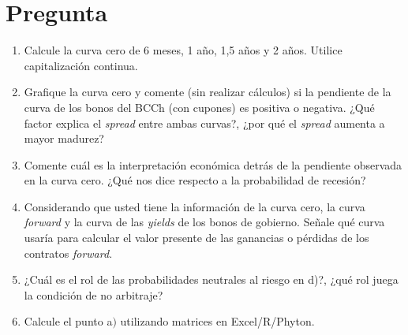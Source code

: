 \documentclass{beamer}
\begin{document}
\section{Pregunta }
  \begin{frame} 
  
\begin{enumerate}[label=\textbf{\alph*)}]
  \footnotesize
  \item Calcule la curva cero de 6 meses, 1 año, 1,5 años y 2 años.
   Utilice capitalización continua.
   \vspace{4pt}
   
   \item Grafique la curva cero y comente (sin realizar cálculos) si 
   la pendiente de la curva de los bonos del BCCh (con cupones) es 
   positiva o negativa. ¿Qué factor explica el \textit{spread} entre 
   ambas curvas?, ¿por qué el \textit{spread} aumenta a mayor madurez?
   \vspace{4pt}
   
   \item Comente cuál es la interpretación económica detrás de la 
   pendiente observada en la curva cero. ¿Qué nos dice respecto a 
   la probabilidad de recesión?
   
   \vspace{4pt}
   \item Considerando que usted tiene la información de la curva cero, 
   la curva \textit{forward} y la curva de las \textit{yields} de los 
   bonos de gobierno. Señale qué curva usaría para calcular el valor 
   presente de las ganancias o pérdidas de los contratos \textit{forward}.
   \vspace{4pt}
   
   \item ¿Cuál es el rol de las probabilidades neutrales al riesgo en d)?, 
   ¿qué rol juega la condición de no arbitraje?
   \vspace{4pt}
  
  \item Calcule el punto a$)$ utilizando matrices en Excel/R/Phyton.
\end{enumerate}

  \end{frame}  
\end{document}
